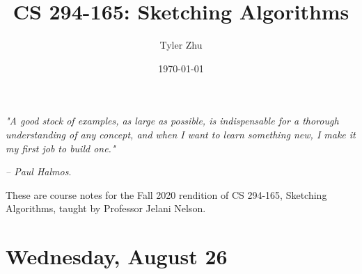 \documentclass[11 pt]{scrartcl}
\begin{document}
 
\title{\Large CS 294-165: Sketching Algorithms}
\author{\large Tyler Zhu}
\date{\large\today}

\maketitle 

\begin{center}
\begin{displayquote}
    \emph{"A good stock of examples, as large as possible, is indispensable for a thorough understanding of any concept, and when I want to learn something new, I make it my first job to build one."} \\ \begin{flushright} \emph{– Paul Halmos}.  \end{flushright}
\end{displayquote}
\end{center}


These are course notes for the Fall 2020 rendition of CS 294-165, Sketching Algorithms, taught by Professor Jelani Nelson.

\tableofcontents 

\newpage

\section{Wednesday, August 26}
\end{document}
